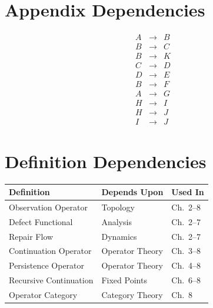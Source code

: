\documentclass[11pt]{book}
\numberwithin{equation}{chapter}
\theoremstyle{definition}
\theoremstyle{plain}
\begin{document}

\section{Appendix Dependencies}

\[
\begin{array}{lll}
A &\rightarrow& B
\\
B &\rightarrow& C
\\
B &\rightarrow& K
\\
C &\rightarrow& D
\\
D &\rightarrow& E
\\
B &\rightarrow& F
\\
A &\rightarrow& G
\\
H &\rightarrow& I
\\
H &\rightarrow& J
\\
I &\rightarrow& J
\end{array}
\]


\section{Definition Dependencies}

\begin{center}

\begin{tabular}{lll}

Definition &
Depends Upon &
Used In
\\
\hline

Observation Operator &
Topology &
Ch.~2--8
\\

Defect Functional &
Analysis &
Ch.~2--7
\\

Repair Flow &
Dynamics &
Ch.~2--7
\\

Continuation Operator &
Operator Theory &
Ch.~3--8
\\

Persistence Operator &
Operator Theory &
Ch.~4--8
\\

Recursive Continuation &
Fixed Points &
Ch.~6--8
\\

Operator Category &
Category Theory &
Ch.~8

\end{tabular}

\end{center}
\end{document}
